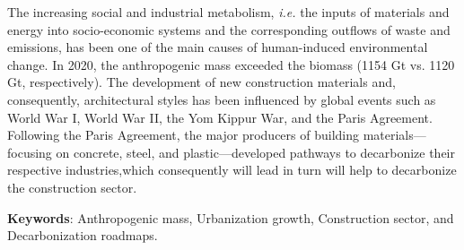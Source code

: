 The increasing social and industrial metabolism, \textit{i.e.} the inputs of materials and energy into socio-economic systems and the corresponding outflows of waste and emissions, has been one of the main causes of human-induced environmental change. In 2020, the anthropogenic mass exceeded the biomass (1154 Gt vs. 1120 Gt, respectively). The development of new construction materials and, consequently, architectural styles has been influenced by global events such as World War I, World War II, the Yom Kippur War, and the Paris Agreement. Following the Paris Agreement, the major producers of building materials—focusing on concrete, steel, and plastic—developed pathways to decarbonize their respective industries,which consequently will lead in turn will help to decarbonize the construction sector.

\vfill

\textbf{Keywords}: Anthropogenic mass, Urbanization growth, Construction sector, and Decarbonization roadmaps.


